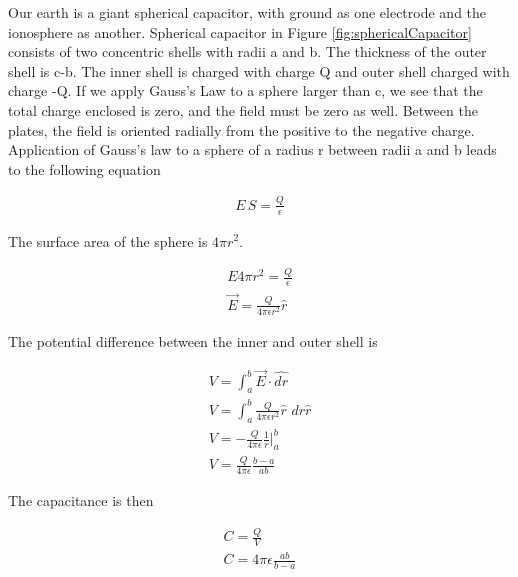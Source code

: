 \documentclass{ximera}
\begin{document}
Our earth is a giant spherical capacitor, with ground as one electrode and the ionosphere as another.  Spherical capacitor in Figure \ref{fig:sphericalCapacitor} consists of two concentric shells with radii a and b. The thickness of the outer shell is c-b.  The inner shell is charged with charge Q and outer shell charged with charge -Q. If we apply Gauss's Law to a sphere larger than c, we see that the total charge enclosed is zero, and the field must be zero as well. Between the plates, the field is oriented radially from the positive to the negative charge. Application of Gauss's law to a sphere of a radius r between radii a and b leads to the following equation

\begin{eqnarray}
E\,S = \frac{Q}{\epsilon}
\end{eqnarray}

The surface area of the sphere is $4 \pi r^2$.


\begin{eqnarray}
E 4 \pi r^2 = \frac{Q}{\epsilon} \\
\vec{E}=\frac{Q}{4 \pi \epsilon r^2} \hat{r}
\end{eqnarray}

The potential difference between the inner and outer shell is


\begin{eqnarray}
V=\int_a^b  \vec{E} \cdot  \hat{dr} \\
V=\int_a^b \frac{Q}{4 \pi \epsilon r^2} \hat{r} \,\, dr \hat{r} \\
V=-\frac{Q}{4 \pi \epsilon} \frac{1}{r}|_a^b \\
V=\frac{Q}{4 \pi \epsilon} \frac{b-a}{ab}
\end{eqnarray}

The capacitance is then


\begin{eqnarray}
C=\frac{Q}{V} \\
C=4 \pi \epsilon \frac{ab}{b-a}
\end{eqnarray}
\end{document}
